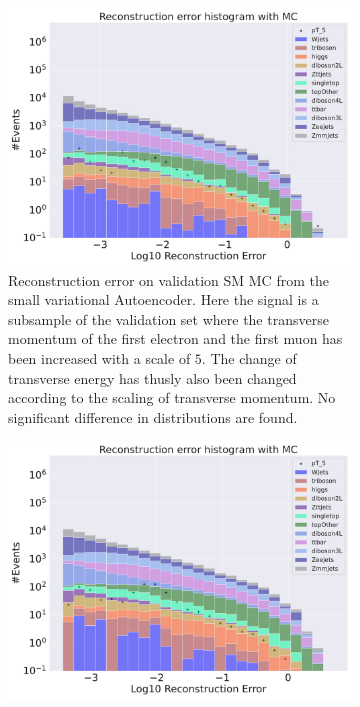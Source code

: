 \begin{figure}[h!]
    \centering
    \begin{subfigure}{.45\textwidth}
        \includegraphics[width=\textwidth]{Figures/AE_testing/small/b_data_recon_big_rm3_feats_sig_pT_5.pdf}
        \caption{Reconstruction error on validation SM MC from the small variational Autoencoder. Here the signal is a subsample of the validation 
        set where the transverse momentum of the first electron and the first muon has been increased with a scale of $5$. The change of transverse 
        energy has thusly also been changed according to the scaling of transverse momentum. No significant difference in distributions are found. }
        \label{fig:ae_small_pt_5}
    \end{subfigure}
    \hfill 
    \begin{subfigure}{.45\textwidth}
        \includegraphics[width=\textwidth]{Figures/AE_testing/big/b_data_recon_big_rm3_feats_sig_pT_5.pdf}

\end{subfigure}
\end{figure}
